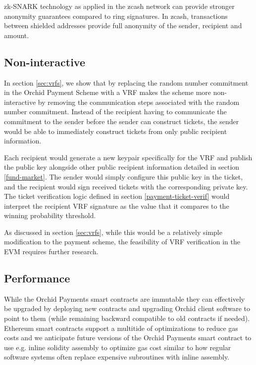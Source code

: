 zk-SNARK\cite{zkSNARKs} technology as applied in the zcash network \cite{zcash-zksnarks} can provide stronger anonymity guarantees compared to ring signatures. In zcash, transactions between shielded addresses provide full anonymity of the sender, recipient and amount.


\subsection{Non-interactive}

In section \ref{sec:vrfs}, we show that by replacing the random number commitment in the Orchid Payment Scheme with a VRF makes the scheme more non-interactive by removing the communication steps associated with the random number commitment. Instead of the recipient having to communicate the commitment to the sender before the sender can construct tickets, the sender would be able to immediately construct tickets from only public recipient information.

Each recipient would generate a new keypair specifically for the VRF and publish the public key alongside other public recipient information detailed in section \ref{fund-market}. The sender would simply configure this public key in the ticket, and the recipient would sign received tickets with the corresponding private key. The ticket verification logic defined in section \ref{payment-ticket-verif} would interpret the recipient VRF signature as the value that it compares to the winning probability threshold.

As discussed in section \ref{sec:vrfs}, while this would be a relatively simple modification to the payment scheme, the feasibility of VRF verification in the EVM requires further research.

\subsection{Performance}

While the Orchid Payments smart contracts are immutable they can effectively be upgraded by deploying new contracts and upgrading Orchid client software to point to them (while remaining backward compatible to old contracts if needed). Ethereum smart contracts support a multitide of optimizations to reduce gas costs and we anticipate future versions of the Orchid Payments smart contract to use e.g. inline solidity assembly \cite{SolidityAssembly} to optimize gas cost similar to how regular software systems often replace expensive subroutines with inline assembly.

